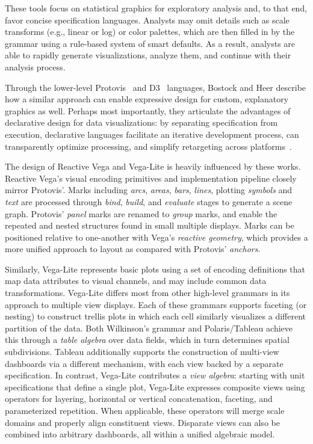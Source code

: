 These tools focus on statistical graphics for exploratory analysis and, to that
end, favor concise specification languages. Analysts may omit details such as
scale transforms (e.g., linear or log) or color palettes, which are then filled
in by the grammar using a rule-based system of smart defaults. As a result,
analysts are able to rapidly generate visualizations, analyze them, and continue
with their analysis process.

Through the lower-level Protovis~\cite{bostock:protovis,heer:protovisjava} and
D3~\cite{bostock:d3} languages, Bostock and Heer describe how a similar approach
can enable expressive design for custom, explanatory graphics as well. Perhaps
most importantly, they articulate the advantages of declarative design for data
visualizations: by separating specification from execution, declarative
languages facilitate an iterative development process, can transparently
optimize processing, and simplify retargeting across
platforms~\cite{heer:protovisjava}.

The design of Reactive Vega and Vega-Lite is heavily influenced by these works.
Reactive Vega's visual encoding primitives and implementation pipeline closely
mirror Protovis'. Marks including \emph{arcs}, \emph{areas}, \emph{bars},
\emph{lines}, plotting \emph{symbols} and \emph{text} are processed through
\emph{bind}, \emph{build}, and \emph{evaluate} stages to generate a scene graph.
Protovis' \emph{panel} marks are renamed to \emph{group} marks, and enable the
repeated and nested structures found in small multiple displays. Marks can be
positioned relative to one-another with Vega's \emph{reactive geometry}, which
provides a more unified approach to layout as compared with Protovis'
\emph{anchors}.

Similarly, Vega-Lite represents basic plots using a set of encoding definitions
that map data attributes to visual channels, and may include common data
transformations. Vega-Lite differs most from other high-level grammars in its
approach to multiple view displays. Each of these grammars supports faceting (or
nesting) to construct trellis plots in which each cell similarly visualizes a
different partition of the data. Both Wilkinson's grammar and Polaris/Tableau
achieve this through a \emph{table algebra} over data fields, which in turn
determines spatial subdivisions. Tableau additionally supports the construction
of multi-view dashboards via a different mechanism, with each view backed by a
separate specification. In contrast, Vega-Lite contributes a \emph{view
algebra}: starting with unit specifications that define a single plot, Vega-Lite
expresses composite views using operators for layering, horizontal or vertical
concatenation, faceting, and parameterized repetition. When applicable, these
operators will merge scale domains and properly align constituent views.
Disparate views can also be combined into arbitrary dashboards, all within a
unified algebraic model.


